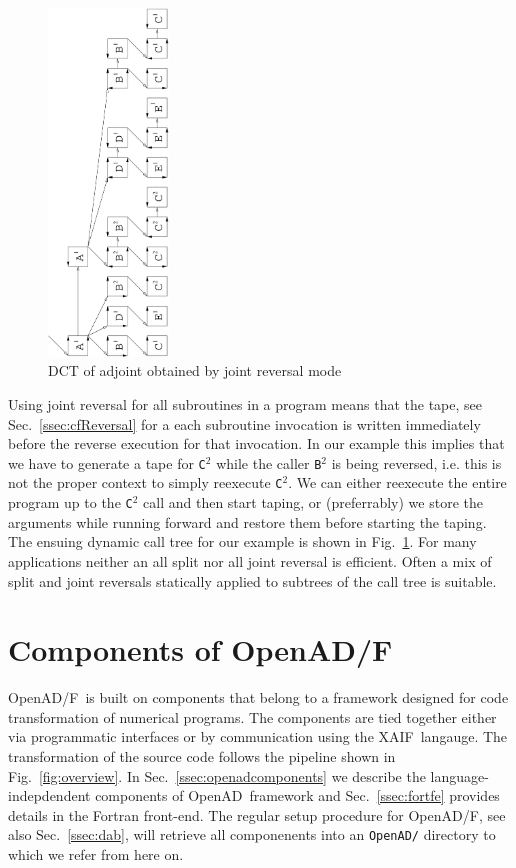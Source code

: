 \documentclass[11pt]{article}
\newcommand{\OpenADF}{OpenAD/F}
\newcommand{\OpenAD}{OpenAD}
\newcommand{\xaif}{XAIF}
\newcommand{\code}[1]{{\small\tt{#1}}}
\newcommand{\refsec}[1]{{Sec.~\ref{#1}}}
\newcommand{\reffig}[1]{{Fig.~\ref{#1}}}
\begin{document}
\begin{figure}[t]
  \centerline{\includegraphics[width=3.2cm,origin=c,angle=-90]{edct_joint_ns}}
  \vspace*{-3cm}
  \caption{DCT of adjoint obtained by joint reversal mode}
  \label{fig:joint}
\end{figure}

Using joint reversal for all subroutines in a program 
means that the tape, see \refsec{ssec:cfReversal} for a each 
subroutine invocation is written immediately before the reverse execution for 
that invocation. In our example this implies that we have to generate 
a tape for {\tt C}$^2$ while the caller {\tt B}$^2$ is being reversed, 
i.e. this is not the proper context to simply reexecute {\tt C}$^2$. 
We can either reexecute the entire program up to the  {\tt C}$^2$
call and then start taping, or (preferrably) we store the arguments while 
running forward and restore them before starting the taping. 
The ensuing dynamic call tree for our example is 
shown in \reffig{fig:joint}. 
For many applications neither an all split nor all joint reversal
is efficient. Often a mix of split and joint reversals statically  
applied to subtrees of the call tree is suitable.  

\section{Components of \OpenADF}\label{sec:openadfcomponents}

\OpenADF\ is built on components that belong to a framework designed
for code transformation of numerical programs.  The components are
tied together either via programmatic interfaces or by communication
using the \xaif\ langauge. The transformation of the source code follows the
pipeline shown in \reffig{fig:overview}.  
In \refsec{ssec:openadcomponents} we describe the language-indepdendent 
components of \OpenAD\ framework and \refsec{ssec:fortfe} provides details 
in the Fortran front-end.
The regular setup procedure for \OpenADF, see also \refsec{ssec:dab}, 
will retrieve all componenents into an \code{OpenAD/} directory to which 
we refer from here on.  
\end{document}
